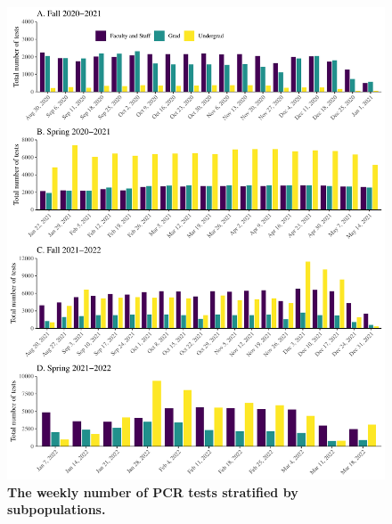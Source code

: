 \documentclass[12pt]{article}
\begin{document}
\begin{figure}[!htp]
\includegraphics[width=\textwidth]{../figure_princeton_new/figure_princeton_testing.pdf}
\caption{
\textbf{The weekly number of PCR tests stratified by subpopulations.}
}
\end{figure}

\pagebreak
\end{document}
